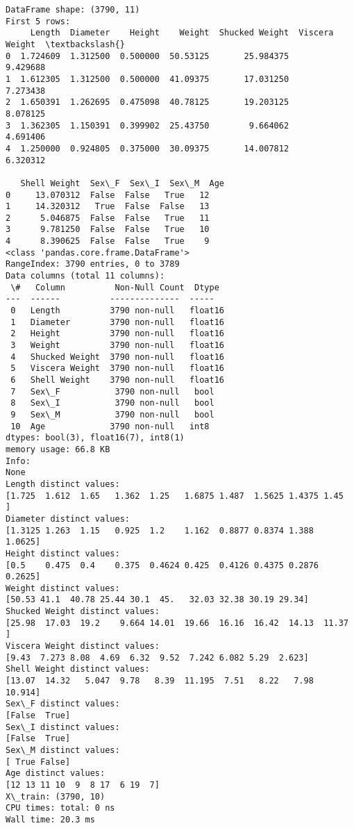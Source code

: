 \documentclass[11pt]{article}
\begin{document}
    \begin{Verbatim}[commandchars=\\\{\}]
DataFrame shape: (3790, 11)
First 5 rows:
     Length  Diameter    Height    Weight  Shucked Weight  Viscera Weight  \textbackslash{}
0  1.724609  1.312500  0.500000  50.53125       25.984375        9.429688
1  1.612305  1.312500  0.500000  41.09375       17.031250        7.273438
2  1.650391  1.262695  0.475098  40.78125       19.203125        8.078125
3  1.362305  1.150391  0.399902  25.43750        9.664062        4.691406
4  1.250000  0.924805  0.375000  30.09375       14.007812        6.320312

   Shell Weight  Sex\_F  Sex\_I  Sex\_M  Age
0     13.070312  False  False   True   12
1     14.320312   True  False  False   13
2      5.046875  False  False   True   11
3      9.781250  False  False   True   10
4      8.390625  False  False   True    9
<class 'pandas.core.frame.DataFrame'>
RangeIndex: 3790 entries, 0 to 3789
Data columns (total 11 columns):
 \#   Column          Non-Null Count  Dtype
---  ------          --------------  -----
 0   Length          3790 non-null   float16
 1   Diameter        3790 non-null   float16
 2   Height          3790 non-null   float16
 3   Weight          3790 non-null   float16
 4   Shucked Weight  3790 non-null   float16
 5   Viscera Weight  3790 non-null   float16
 6   Shell Weight    3790 non-null   float16
 7   Sex\_F           3790 non-null   bool
 8   Sex\_I           3790 non-null   bool
 9   Sex\_M           3790 non-null   bool
 10  Age             3790 non-null   int8
dtypes: bool(3), float16(7), int8(1)
memory usage: 66.8 KB
Info:
None
Length distinct values:
[1.725  1.612  1.65   1.362  1.25   1.6875 1.487  1.5625 1.4375 1.45  ]
Diameter distinct values:
[1.3125 1.263  1.15   0.925  1.2    1.162  0.8877 0.8374 1.388  1.0625]
Height distinct values:
[0.5    0.475  0.4    0.375  0.4624 0.425  0.4126 0.4375 0.2876 0.2625]
Weight distinct values:
[50.53 41.1  40.78 25.44 30.1  45.   32.03 32.38 30.19 29.34]
Shucked Weight distinct values:
[25.98  17.03  19.2    9.664 14.01  19.66  16.16  16.42  14.13  11.37 ]
Viscera Weight distinct values:
[9.43  7.273 8.08  4.69  6.32  9.52  7.242 6.082 5.29  2.623]
Shell Weight distinct values:
[13.07  14.32   5.047  9.78   8.39  11.195  7.51   8.22   7.98  10.914]
Sex\_F distinct values:
[False  True]
Sex\_I distinct values:
[False  True]
Sex\_M distinct values:
[ True False]
Age distinct values:
[12 13 11 10  9  8 17  6 19  7]
X\_train: (3790, 10)
CPU times: total: 0 ns
Wall time: 20.3 ms
    \end{Verbatim}
\end{document}
